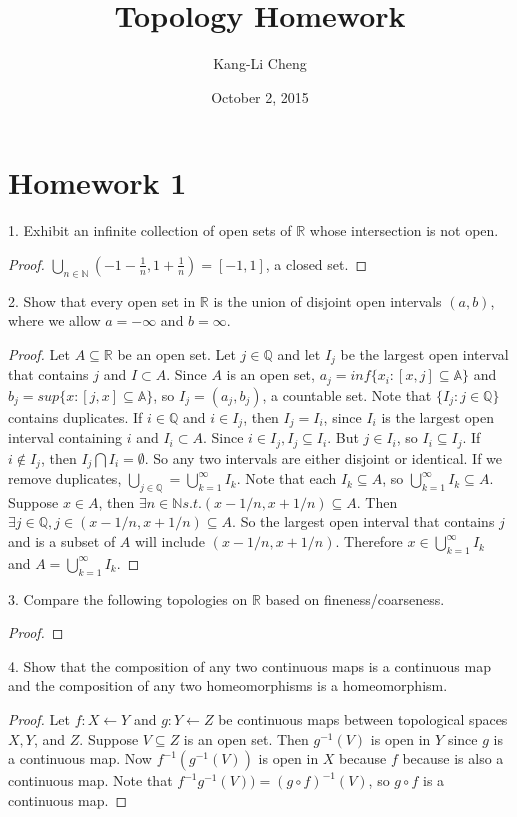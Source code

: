 \documentclass{amsart}
\title{Topology Homework}
\author{Kang-Li Cheng}
\date{October 2, 2015}
\begin{document}
\maketitle

\section{Homework 1}
1. Exhibit an infinite collection of open sets of $\mathbb{R}$ whose intersection is not open. 
\begin{proof}
$\bigcup_{n\in\mathbb{N}}(-1-\frac{1}{n}, 1+\frac{1}{n})=[-1, 1]$, a closed set. 
\end{proof}

2. Show that every open set in $\mathbb{R}$ is the union of disjoint open intervals $(a, b)$, where we allow $a=-\infty$ and $b=\infty$. 
\begin{proof}
Let $A\subseteq\mathbb{R}$ be an open set. Let $j\in\mathbb{Q}$ and let $I_j$ be the largest open interval that contains $j$ and $I\subset A$. Since $A$ is an open set, $a_j=inf\{x_i:[x, j]\subseteq\mathbb{A}\}$ and $b_j=sup\{x:[j,x]\subseteq\mathbb{A}\}$, so $I_j=(a_j, b_j)$, a countable set. 
Note that $\{I_j:j\in\mathbb{Q}\}$ contains duplicates. If $i\in\mathbb{Q}$ and $i\in I_j$, then $I_j=I_i$, since $I_i$ is the largest open interval containing $i$ and $I_i\subset A$. Since $i\in I_j, I_j\subseteq I_i$. But $j\in I_i$, so $I_i\subseteq I_j$. If $i\notin I_j$, then $I_j\bigcap I_i=\emptyset$. So any two intervals are either disjoint or identical. If we remove duplicates, $\bigcup_{j\in\mathbb{Q}}=\bigcup_{k=1}^\infty I_k$. Note that each $I_k\subseteq A$, so $\bigcup_{k=1}^\infty I_k\subseteq A$. Suppose $x\in A$, then $\exists n\in\mathbb{N} s.t. (x-1/n, x+1/n)\subseteq A$. Then $\exists j\in\mathbb{Q}, j\in(x-1/n, x+1/n)\subseteq A$. So the largest open interval that contains $j$ and is a subset of $A$ will include $(x-1/n, x+1/n)$. Therefore $x\in\bigcup_{k=1}^\infty I_k$ and $A= \bigcup_{k=1}^\infty I_k$. 
\end{proof}
3. Compare the following topologies on $\mathbb{R}$ based on fineness/coarseness.
\begin{proof}
\end{proof}
4. Show that the composition of any two continuous maps is a continuous map and the composition of any two homeomorphisms is a homeomorphism.
\begin{proof}
Let $f:X\leftarrow Y$ and $g:Y\leftarrow Z$ be continuous maps between topological spaces $X, Y$, and $Z$. Suppose $V\subseteq Z$ is an open set. Then $g^{-1}(V)$ is open in $Y$ since $g$ is a continuous map. Now $f^{-1}(g^{-1}(V))$ is open in $X$ because $f$ because is also a continuous map. Note that $f^{-1}g^{-1}(V))=(g\circ f)^{-1}(V)$, so $g\circ f$ is a continuous map. 



\end{proof}
\end{document}
